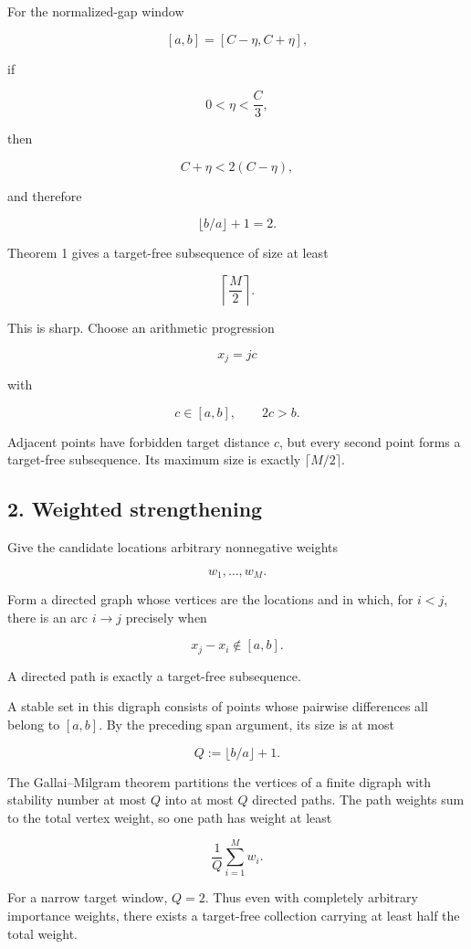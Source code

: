 For the normalized-gap window

\[
[a,b]=[C-\eta,C+\eta],
\]

if

\[
0<\eta<\frac C3,
\]

then

\[
C+\eta<2(C-\eta),
\]

and therefore

\[
\lfloor b/a\rfloor+1=2.
\]

Theorem 1 gives a target-free subsequence of size at least

\[
\boxed{\left\lceil\frac M2\right\rceil.}
\tag{2}
\]

This is sharp. Choose an arithmetic progression

\[
x_j=jc
\]

with

\[
c\in[a,b],
\qquad
2c>b.
\]

Adjacent points have forbidden target distance \(c\), but every second point forms a target-free subsequence. Its maximum size is exactly \(\lceil M/2\rceil\).

\subsection*{2. Weighted strengthening}

Give the candidate locations arbitrary nonnegative weights

\[
w_1,\ldots,w_M.
\]

Form a directed graph whose vertices are the locations and in which, for \(i<j\), there is an arc \(i\to j\) precisely when

\[
x_j-x_i\notin[a,b].
\]

A directed path is exactly a target-free subsequence.

A stable set in this digraph consists of points whose pairwise differences all belong to \([a,b]\). By the preceding span argument, its size is at most

\[
Q:=\lfloor b/a\rfloor+1.
\]

The Gallai--Milgram theorem partitions the vertices of a finite digraph with stability number at most \(Q\) into at most \(Q\) directed paths. The path weights sum to the total vertex weight, so one path has weight at least

\[
\boxed{
\frac1Q\sum_{i=1}^{M}w_i.
}
\tag{3}
\]

For a narrow target window, \(Q=2\). Thus even with completely arbitrary importance weights, there exists a target-free collection carrying at least half the total weight.

